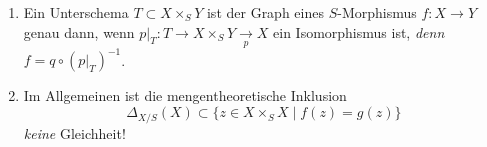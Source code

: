 \begin{rem}[29]
  \mbox{}
  \begin{enumerate}
  \item Ein Unterschema $T\subset X\times_{S}Y$ ist der Graph eines $S$-Morphismus
    $f:X\rightarrow Y$ genau dann, wenn $p|_{T}:T\rightarrow X\times_{S}Y\underset{p}{\rightarrow}X$
    ein Isomorphismus ist, \emph{denn }$f=q\circ(p|_{T})^{-1}$.
  \item Im Allgemeinen ist die mengentheoretische Inklusion
    \[
      \Delta_{X/S}(X)\subset\{z\in X\times_{S}X\mid f(z)=g(z)\}
    \]
    \emph{keine} Gleichheit!
  \end{enumerate}
\end{rem}

